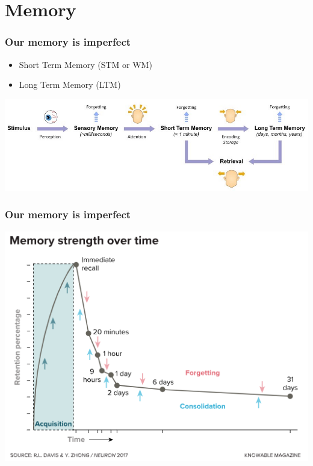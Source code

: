 \documentclass{beamer}
\begin{document}
%

\section{Memory}

\begin{frame}
	\frametitle{Our memory is imperfect}
	\begin{itemize}
		\item Short Term Memory (STM or WM)
		\item Long Term Memory (LTM)
	\end{itemize}
	\centering
	\includegraphics[width=1\linewidth]{image/memory}
\end{frame}

\begin{frame}
	\frametitle{Our memory is imperfect}
	\centering
	\includegraphics[width=0.8\linewidth]{image/decay}
\end{frame}
\end{document}
